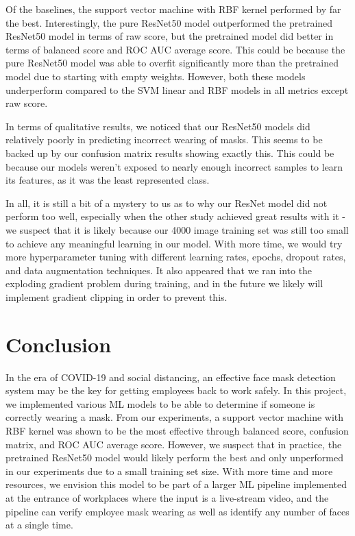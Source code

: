 \documentclass{article}
\begin{document}
Of the baselines, the support vector machine with RBF kernel performed by far the best. Interestingly, the pure ResNet50 model outperformed the pretrained ResNet50 model in terms of raw score, but the pretrained model did better in terms of balanced score and ROC AUC average score. This could be because the pure ResNet50 model was able to overfit significantly more than the pretrained model due to starting with empty weights. However, both these models underperform compared to the SVM linear and RBF models in all metrics except raw score.

In terms of qualitative results, we noticed that our ResNet50 models did relatively poorly in predicting incorrect wearing of masks. This seems to be backed up by our confusion matrix results showing exactly this. This could be because our models weren’t exposed to nearly enough incorrect samples to learn its features, as it was the least represented class.

In all, it is still a bit of a mystery to us as to why our ResNet model did not perform too well, especially when the other study achieved great results with it - we suspect that it is likely because our 4000 image training set was still too small to achieve any meaningful learning in our model. With more time, we would try more hyperparameter tuning with different learning rates, epochs, dropout rates, and data augmentation techniques. It also appeared that we ran into the exploding gradient problem during training, and in the future we likely will implement gradient clipping in order to prevent this.

\section{Conclusion}
In the era of COVID-19 and social distancing, an effective face mask detection system may be the key for getting employees back to work safely. In this project, we implemented various ML models to be able to determine if someone is correctly wearing a mask. From our experiments, a support vector machine with RBF kernel was shown to be the most effective through balanced score, confusion matrix, and ROC AUC average score. However, we suspect that in practice, the pretrained ResNet50 model would likely perform the best and only unperformed in our experiments due to a small training set size. With more time and more resources, we envision this model to be part of a larger ML pipeline implemented at the entrance of workplaces where the input is a live-stream video, and the pipeline can verify employee mask wearing as well as identify any number of faces at a single time.
\end{document}
